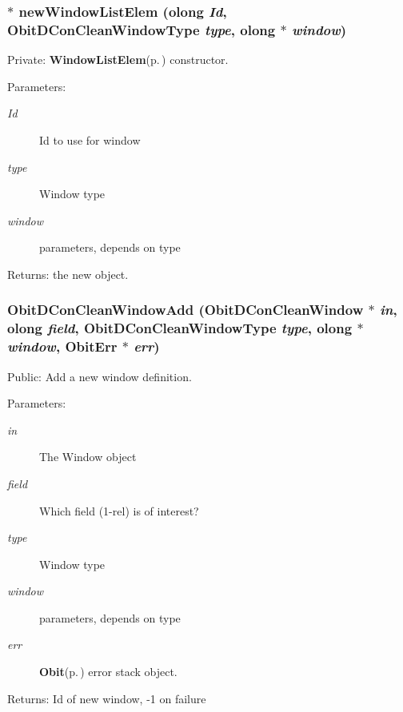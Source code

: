 \subsubsection{ $\ast$ new\-Window\-List\-Elem ({\bf olong} {\em Id}, {\bf Obit\-DCon\-Clean\-Window\-Type} {\em type}, {\bf olong} $\ast$ {\em window})}\label{ObitDConCleanWindow_8c_a7}


Private: {\bf Window\-List\-Elem}{\rm (p.\,\pageref{structWindowListElem})} constructor. 

\begin{Desc}
\item[Parameters:]
\begin{description}
\item[{\em Id}]Id to use for window \item[{\em type}]Window type \item[{\em window}]parameters, depends on type \end{description}
\end{Desc}
\begin{Desc}
\item[Returns:]the new object. \end{Desc}
\subsubsection{ Obit\-DCon\-Clean\-Window\-Add ({\bf Obit\-DCon\-Clean\-Window} $\ast$ {\em in}, {\bf olong} {\em field}, {\bf Obit\-DCon\-Clean\-Window\-Type} {\em type}, {\bf olong} $\ast$ {\em window}, {\bf Obit\-Err} $\ast$ {\em err})}\label{ObitDConCleanWindow_8c_a19}


Public: Add a new window definition. 

\begin{Desc}
\item[Parameters:]
\begin{description}
\item[{\em in}]The Window object \item[{\em field}]Which field (1-rel) is of interest? \item[{\em type}]Window type \item[{\em window}]parameters, depends on type \item[{\em err}]{\bf Obit}{\rm (p.\,\pageref{structObit})} error stack object. \end{description}
\end{Desc}
\begin{Desc}
\item[Returns:]Id of new window, -1 on failure \end{Desc}
